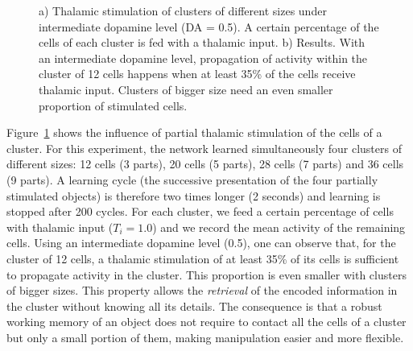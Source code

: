 \documentclass[
  11pt,
  a4paper,
]{scrbook}
\begin{document}
\begin{figure}


\caption{\label{fig-jocn:thal}a) Thalamic stimulation of clusters of
different sizes under intermediate dopamine level (DA = 0.5). A certain
percentage of the cells of each cluster is fed with a thalamic input. b)
Results. With an intermediate dopamine level, propagation of activity
within the cluster of 12 cells happens when at least 35\% of the cells
receive thalamic input. Clusters of bigger size need an even smaller
proportion of stimulated cells.}

\end{figure}%

Figure~\ref{fig-jocn:thal} shows the influence of partial thalamic
stimulation of the cells of a cluster. For this experiment, the network
learned simultaneously four clusters of different sizes: 12 cells (3
parts), 20 cells (5 parts), 28 cells (7 parts) and 36 cells (9 parts). A
learning cycle (the successive presentation of the four partially
stimulated objects) is therefore two times longer (2 seconds) and
learning is stopped after 200 cycles. For each cluster, we feed a
certain percentage of cells with thalamic input (\(T_i = 1.0\)) and we
record the mean activity of the remaining cells. Using an intermediate
dopamine level (0.5), one can observe that, for the cluster of 12 cells,
a thalamic stimulation of at least 35\% of its cells is sufficient to
propagate activity in the cluster. This proportion is even smaller with
clusters of bigger sizes. This property allows the \emph{retrieval} of
the encoded information in the cluster without knowing all its details.
The consequence is that a robust working memory of an object does not
require to contact all the cells of a cluster but only a small portion
of them, making manipulation easier and more flexible.
\end{document}
